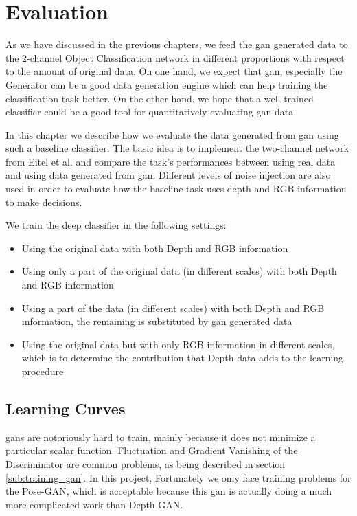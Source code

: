 
\chapter{Evaluation\label{cha:evaluation}}
As we have discussed in the previous chapters, we feed the \acrshort{gan} generated data
to the 2-channel Object Classification network in different proportions with respect to
the amount of original data. On one hand, we expect that \acrshort{gan}, especially the
Generator can be a good data generation engine which can help training the classification
task better. On the other hand, we hope that a well-trained classifier could be a good
tool for quantitatively evaluating \acrshort{gan} data.

In this chapter we describe how we evaluate the data generated from \acrshort{gan} using
such a baseline classifier. The basic idea is to implement the two-channel network from
Eitel et al. \cite{eitel} and compare the task's performances between using real data and
using data generated from \acrshort{gan}. Different levels of noise injection are also
used in order to evaluate how the baseline task uses depth and RGB information to make
decisions.

We train the deep classifier in the following settings:

\begin{itemize}
	\item Using the original data with both Depth and RGB information
	\item Using only a part of the original data (in different scales) with both Depth and
		RGB information
	\item Using a part of the data (in different scales) with both Depth and RGB
		information, the remaining is substituted by \acrshort{gan} generated data
	\item Using the original data but with only RGB information in different scales, which
		is to determine the contribution that Depth data adds to the learning procedure
\end{itemize}

\section{Learning Curves}
\label{sec:learning_curves}

\acrshort{gan}s are notoriously hard to train, mainly because it does not minimize a
particular scalar function. Fluctuation and Gradient Vanishing of the Discriminator are
common problems, as being described in section \ref{sub:training_gan}. In this project,
Fortunately we only face training problems for the Pose-GAN, which is acceptable because
this \acrshort{gan} is actually doing a much more complicated work than Depth-GAN.

